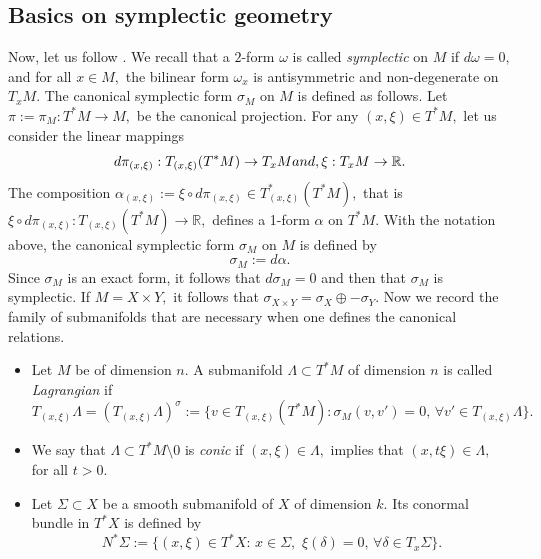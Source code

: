 \documentclass[12pt, reqno]{amsart}
\theoremstyle{definition}
\theoremstyle{remark}
\numberwithin{equation}{section}
\begin{document}
\subsection{Basics on symplectic geometry} Now, let us follow  \cite[Chapter I]{Ruzhansky:CWI-book}.
 We recall that a $2$-form $\omega$ is called {\it symplectic}  on $M$ if $d\omega =0,$ and for all $x\in M,$ the bilinear form $\omega_x$  is antisymmetric and non-degenerate on $T_{x}M$. The canonical symplectic form $\sigma_M$ on $M$ is defined as follows. Let $\pi:=\pi_M:T^*M\rightarrow M,$ be the canonical projection. For any $(x,\xi)\in T^*M,$ let us consider the linear mappings
\begin{equation*}
    d\pi_{(x,\xi)}:T_{(x,\xi)}(T^*M)\rightarrow T_{x}M\textnormal{   and,   }\xi:T_{x}M\rightarrow \mathbb{R}.
\end{equation*}The composition $\alpha_{(x,\xi)}:=\xi\circ d\pi_{(x,\xi)}\in T^{*}_{(x,\xi)}(T^*M),$ that is
$
   \xi\circ d\pi_{(x,\xi)}:T_{(x,\xi)}(T^*M)\rightarrow  \mathbb{R},
$ defines  a 1-form $\alpha $ on $T^*M.$ With the notation above, the canonical symplectic form $\sigma_M$ on $M$ is defined by 
\begin{equation}\label{sigmaM}
    \sigma_M:=d\alpha.
\end{equation}Since $\sigma_M$ is an exact form, it follows that $d\sigma_M=0$ and then  that $\sigma_M$ is symplectic. If $M=X\times Y,$ it follows that  $\sigma_{X\times Y}=\sigma_X\oplus -\sigma_Y .$ Now we record the family of submanifolds that are necessary when one defines the canonical relations.
\begin{itemize}
    \item Let $M$ be of dimension $n.$ A submanifold $\Lambda\subset T^*M$ of dimension $n$ is called {\it Lagrangian} if 
\begin{equation*}
    T_{(x,\xi)}\Lambda=( T_{(x,\xi)}\Lambda)^{\sigma}:=\{v\in T_{(x,\xi)}(T^*M):\sigma_M(v,v')=0,\,\forall v'\in T_{(x,\xi)}\Lambda \}.
\end{equation*}
\item We say that  $\Lambda\subset T^*M\setminus 0$ is {\it conic} if $(x,\xi)\in \Lambda,$ implies that $(x,t\xi)\in \Lambda,$ for all $t>0.$ 
\item Let $\Sigma\subset X$ be a smooth submanifold of $X$ of dimension $k.$ Its conormal bundle in $T^*X$ is defined by
\begin{equation}
    N^{*}\Sigma:=\{(x,\xi)\in T^*X: \,x\in \Sigma,\,\,\xi(\delta)=0,\,\forall \delta\in T_{x}\Sigma  \}.
\end{equation}
\end{itemize}
\end{document}
